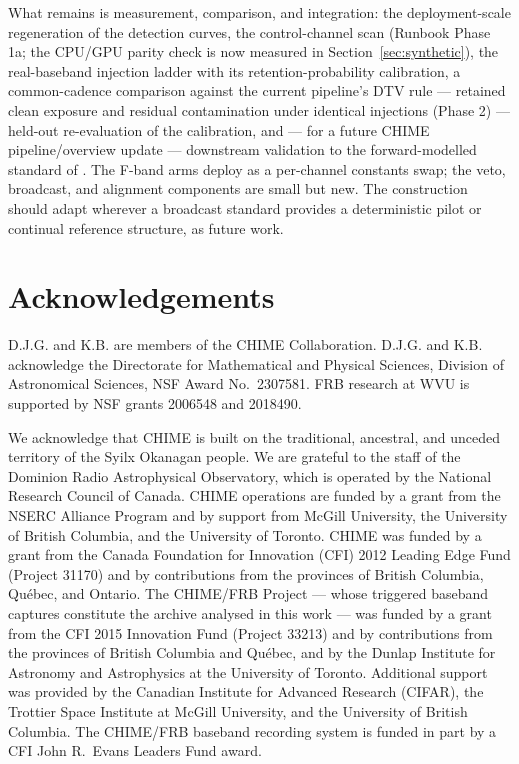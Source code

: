 What remains is measurement, comparison, and integration: the
deployment-scale regeneration of the detection curves, the
control-channel scan (Runbook Phase 1a; the CPU/GPU parity check is
now measured in Section~\ref{sec:synthetic}), the
real-baseband injection ladder with its retention-probability
calibration, a common-cadence comparison against the current pipeline's
DTV rule --- retained clean exposure and residual contamination under
identical injections (Phase 2) --- held-out re-evaluation of the
calibration,
and --- for a future CHIME pipeline/overview update --- downstream
validation to the forward-modelled standard of
\citet{chime2025autopower}. The F-band arms deploy as a per-channel
constants swap; the veto, broadcast, and alignment components are small
but new. The construction should adapt wherever a broadcast standard
provides a deterministic pilot or continual reference structure, as
future work.

\section*{Acknowledgements}
D.J.G. and K.B. are members of the CHIME Collaboration. D.J.G. and K.B.
acknowledge the Directorate for Mathematical and Physical Sciences,
Division of Astronomical Sciences, NSF Award No.~2307581. FRB research
at WVU is supported by NSF grants 2006548 and 2018490.

We acknowledge that CHIME is built on the traditional, ancestral, and
unceded territory of the Syilx Okanagan people. We are grateful to the
staff of the Dominion Radio Astrophysical Observatory, which is operated
by the National Research Council of Canada. CHIME operations are funded
by a grant from the NSERC Alliance Program and by support from McGill
University, the University of British Columbia, and the University of
Toronto. CHIME was funded by a grant from the Canada Foundation for
Innovation (CFI) 2012 Leading Edge Fund (Project 31170) and by
contributions from the provinces of British Columbia, Qu\'ebec, and
Ontario. The CHIME/FRB Project --- whose triggered baseband captures
constitute the archive analysed in this work --- was funded by a grant
from the CFI 2015 Innovation Fund (Project 33213) and by contributions
from the provinces of British Columbia and Qu\'ebec, and by the Dunlap
Institute for Astronomy and Astrophysics at the University of Toronto.
Additional support was provided by the Canadian Institute for Advanced
Research (CIFAR), the Trottier Space Institute at McGill University, and
the University of British Columbia. The CHIME/FRB baseband recording
system is funded in part by a CFI John R.\ Evans Leaders Fund award.

